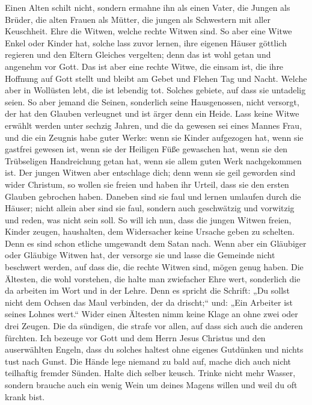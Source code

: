  Einen Alten schilt nicht, sondern ermahne ihn als einen
Vater, die Jungen als Brüder,  die alten Frauen als
Mütter, die jungen als Schwestern mit aller Keuschheit. 
Ehre die Witwen, welche rechte Witwen sind.  So aber eine
Witwe Enkel oder Kinder hat, solche lass zuvor lernen, ihre eigenen
Häuser göttlich regieren und den Eltern Gleiches vergelten; denn das ist
wohl getan und angenehm vor Gott.  Das ist aber eine
rechte Witwe, die einsam ist, die ihre Hoffnung auf Gott stellt und
bleibt am Gebet und Flehen Tag und Nacht.  Welche aber in
Wollüsten lebt, die ist lebendig tot.  Solches gebiete,
auf dass sie untadelig seien.  So aber jemand die Seinen,
sonderlich seine Hausgenossen, nicht versorgt, der hat den Glauben
verleugnet und ist ärger denn ein Heide.  Lass keine Witwe
erwählt werden unter sechzig Jahren, und die da gewesen sei eines Mannes
Frau,  und die ein Zeugnis habe guter Werke: wenn sie
Kinder aufgezogen hat, wenn sie gastfrei gewesen ist, wenn sie der
Heiligen Füße gewaschen hat, wenn sie den Trübseligen Handreichung getan
hat, wenn sie allem guten Werk nachgekommen ist.  Der
jungen Witwen aber entschlage dich; denn wenn sie geil geworden sind
wider Christum, so wollen sie freien  und haben ihr
Urteil, dass sie den ersten Glauben gebrochen haben. 
Daneben sind sie faul und lernen umlaufen durch die Häuser; nicht allein
aber sind sie faul, sondern auch geschwätzig und vorwitzig und reden,
was nicht sein soll.  So will ich nun, dass die jungen
Witwen freien, Kinder zeugen, haushalten, dem Widersacher keine Ursache
geben zu schelten.  Denn es sind schon etliche umgewandt
dem Satan nach.  Wenn aber ein Gläubiger oder Gläubige
Witwen hat, der versorge sie und lasse die Gemeinde nicht beschwert
werden, auf dass die, die rechte Witwen sind, mögen genug haben.
 Die Ältesten, die wohl vorstehen, die halte man
zwiefacher Ehre wert, sonderlich die da arbeiten im Wort und in der
Lehre.  Denn es spricht die Schrift: „Du sollst nicht dem
Ochsen das Maul verbinden, der da drischt;`` und: „Ein Arbeiter ist
seines Lohnes wert.``  Wider einen Ältesten nimm keine
Klage an ohne zwei oder drei Zeugen.  Die da sündigen,
die strafe vor allen, auf dass sich auch die anderen fürchten.
 Ich bezeuge vor Gott und dem Herrn Jesus Christus und
den auserwählten Engeln, dass du solches haltest ohne eigenes Gutdünken
und nichts tust nach Gunst.  Die Hände lege niemand zu
bald auf, mache dich auch nicht teilhaftig fremder Sünden. Halte dich
selber keusch.  Trinke nicht mehr Wasser, sondern brauche
auch ein wenig Wein um deines Magens willen und weil du oft krank bist.


